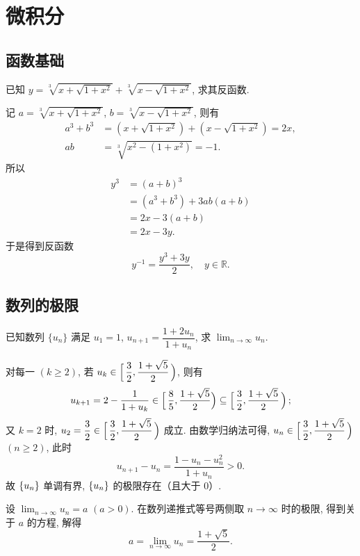 \section{微积分}

\subsection{函数基础}
\begin{exercise}
    已知 $y=\sqrt[3]{x + \sqrt{1 + x^2}} + \sqrt[3]{x - \sqrt{1 + x^2}}$, 求其反函数.
\end{exercise}

\begin{solution}
    记 $a = \sqrt[3]{x + \sqrt{1 + x^2}}$, $b = \sqrt[3]{x - \sqrt{1 + x^2}}$, 则有
    \begin{align*}
        a^3 + b^3 &= (x + \sqrt{1 + x^2}) + (x - \sqrt{1 + x^2}) = 2x, \\
               ab &= \sqrt[3]{x^2 - (1 + x^2)} = -1.
    \end{align*}
    所以
    \begin{align*}
        y^3 
        &= (a + b)^3 \\
        &= (a^3 + b^3) + 3ab (a + b) \\
        &= 2x - 3(a + b) \\
        &= 2x - 3y.
    \end{align*}
    于是得到反函数
    \[
        y^{-1} = \frac{y^3 + 3y}{2},\quad y \in \mathbb{R}.
    \]
\end{solution}

\subsection{数列的极限}

\begin{exercise}[利用单调有界性]
    已知数列 $\{u_n\}$ 满足 $u_1=1$, $u_{n+1}=\dfrac{1+2u_n}{1+u_n}$, 求 $\lim_{n \to \infty}u_n$.
\end{exercise}

\begin{solution}
    
    对每一 $(k \ge 2)$, 若 $\displaystyle u_k \in \intco[2]{\,\frac32,\frac{1+\sqrt{5}}{2}\,}$, 则有
    \[
        u_{k + 1} 
        = 2 - \frac{1}{1 + u_{k}}
        \in \intco[2]{\,\frac 85,\frac{1 + \sqrt{5}}{2}}
        \subseteq \intco[2]{\,\frac 32,\frac{1 + \sqrt{5}}{2}\,} ;
    \]
    又 $k = 2$ 时, $\displaystyle u_2 = \frac32 \in \intco[2]{\,\frac32, \frac{1 + \sqrt{5}}{2}\,}$ 成立. 由数学归纳法可得, $\displaystyle u_n \in \intco[2]{\,\frac32,\frac{1+\sqrt{5}}{2}\,}$ $(n \ge 2)$, 此时
    \[
        u_{n + 1} - u_n = \frac{1 - u_n - u_n^2}{1 + u_n} > 0.
    \]
    故 $\set{u_n}$ 单调有界, $\set{u_n}$ 的极限存在（且大于 $0$）. 
    
    设 $\lim_{n \to \infty}u_n = a$ $(a>0)$. 在数列递推式等号两侧取 $n \to \infty$ 时的极限, 得到关于 $a$ 的方程, 解得
    \[
        a = \lim_{n \to \infty} u_n = \frac{1 + \sqrt{5}}{2}.
    \]
\end{solution}

